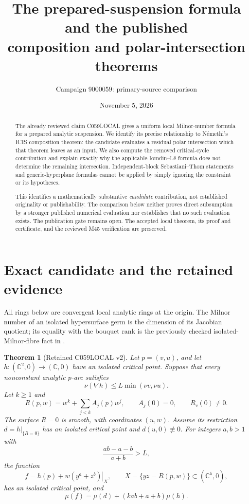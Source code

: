 \documentclass[11pt]{article}
\title{The prepared-suspension formula and the published\\
composition and polar-intersection theorems}
\author{Campaign 9000059: primary-source comparison}
\date{November 5, 2026}
\newtheorem{theorem}{Theorem}
\newcommand{\C}{\mathbb C}
\begin{document}
\maketitle

\begin{abstract}
The already reviewed claim C059LOCAL gives a uniform local
Milnor-number formula for a prepared analytic suspension.  We identify
its precise relationship to N\'emethi's ICIS composition theorem:
the candidate evaluates a residual polar intersection which that
theorem leaves as an input.  We also compute the removed critical-cycle
contribution and explain exactly why the applicable Iomdin--L\^e formula
does not determine the remaining intersection.  Independent-block
Sebastiani--Thom statements and generic-hyperplane formulas cannot be
applied by simply ignoring the constraint or its hypotheses.

This identifies a mathematically substantive \emph{candidate}
contribution, not established originality or publishability.  The
comparison below neither proves direct subsumption by a stronger
published numerical evaluation nor establishes that no such evaluation
exists.  The publication gate remains open.  The accepted local theorem,
its proof and certificate, and the reviewed M45 verification are
preserved.
\end{abstract}

\section{Exact candidate and the retained evidence}

All rings below are convergent local analytic rings at the origin.
The Milnor number of an isolated hypersurface germ is the dimension
of its Jacobian quotient; its equality with the bouquet rank is the
previously checked isolated-Milnor-fibre fact in
\cite[Section 1, items (4)--(5), p.~6]{massey}.

\begin{theorem}[Retained C059LOCAL v2]\label{thm:candidate}
Let \(p=(v,u)\), and let \(h:(\C^2,0)\to(\C,0)\) have an isolated
critical point.  Suppose that every nonconstant analytic \(p\)-arc
satisfies
\[
 \nu(\nabla h)\leq L\min(\nu v,\nu u).
\]
Let \(k\geq1\) and
\[
 R(p,w)=w^k+\sum_{j<k}A_j(p)w^j,\qquad A_j(0)=0,\qquad R_v(0)\ne0.
\]
The surface \(R=0\) is smooth, with coordinates \((u,w)\).
Assume its restriction \(d=h|_{\{R=0\}}\) has an isolated critical
point and \(d(u,0)\not\equiv0\).
For integers \(a,b>1\) with
\[
 \frac{ab-a-b}{a+b}>L,
\]
the function
\[
 f=\left.h(p)+w(y^a+z^b)\right|_{X},\qquad
 X=\{yz=R(p,w)\}\subset(\C^5,0),
\]
has an isolated critical point, and
\begin{equation}\label{eq:candidate}
 \mu(f)=\mu(d)+(kab+a+b)\mu(h).
\end{equation}
\end{theorem}
\end{document}

